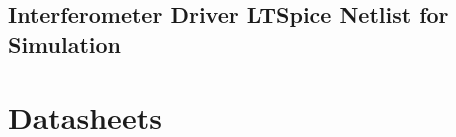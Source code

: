 \documentclass[12pt,journal]{IEEEtran}
\newcommand\ltspicestyle{\lstset{
language=Clean, 
basicstyle=\scriptsize
}}
\newcommand\ltspiceexternal[2][]{{
\ltspicestyle
}}
\begin{document}
\begin{appendices}
\subsection{Interferometer Driver LTSpice Netlist for Simulation}
\ltspiceexternal{../Electrical_Design/Amplifier_Design/Rev_2.0/amplifier_setup_rev2.txt}
\newpage

\section{Datasheets}









 \label{datasheet:nte941m}

 \label{datasheet:nte957}

 \label{datasheet:mcp4725}

 \label{datasheet:arduino_uno}

 \label{datasheet:psin02512n}

 \label{datasheet:ad8627}

\end{appendices}
\end{document}
